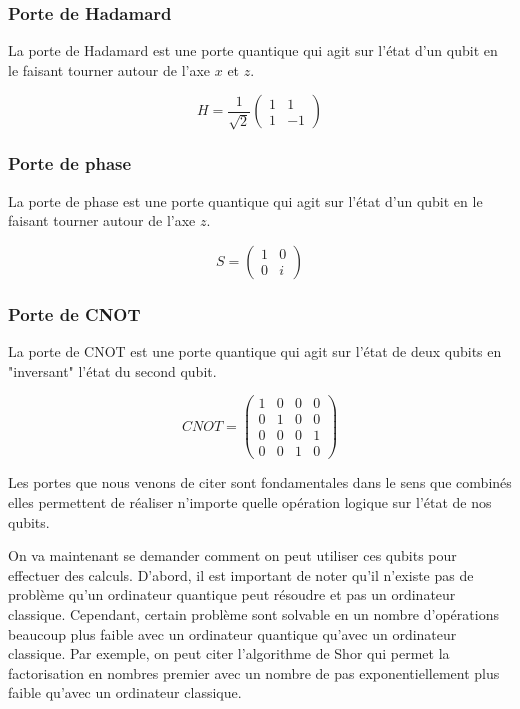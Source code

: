 \documentclass{article}
\begin{document}
\begin{multicols}{2}
\subsubsection{Porte de Hadamard}

La porte de Hadamard est une porte quantique qui agit sur l'état d'un qubit en le faisant tourner autour de l'axe $x$ et $z$.

\begin{equation}
    H = \frac{1}{\sqrt{2}}\begin{pmatrix} 1 & 1 \\ 1 & -1 \end{pmatrix}
\end{equation}

\subsubsection{Porte de phase}

La porte de phase est une porte quantique qui agit sur l'état d'un qubit en le faisant tourner autour de l'axe $z$.

\begin{equation}
    S = \begin{pmatrix} 1 & 0 \\ 0 & i \end{pmatrix}
\end{equation}


\subsubsection{Porte de CNOT}

La porte de CNOT est une porte quantique qui agit sur l'état de deux qubits en "inversant" l'état du second qubit.

\begin{equation}
    CNOT = \begin{pmatrix} 1 & 0 & 0 & 0 \\ 0 & 1 & 0 & 0 \\ 0 & 0 & 0 & 1 \\ 0 & 0 & 1 & 0 \end{pmatrix}
\end{equation}

Les portes que nous venons de citer sont fondamentales dans le sens que combinés elles permettent de réaliser n'importe quelle opération logique sur l'état de nos qubits.



On va maintenant se demander comment on peut utiliser ces qubits pour effectuer des calculs.
D'abord, il est important de noter qu'il n'existe pas de problème qu'un ordinateur quantique peut résoudre et pas un ordinateur classique.
Cependant, certain problème sont solvable en un nombre d'opérations beaucoup plus faible avec un ordinateur quantique qu'avec un ordinateur classique.
Par exemple, on peut citer l'algorithme de Shor qui permet la factorisation en nombres premier avec un nombre de pas exponentiellement plus faible qu'avec un ordinateur classique.




\end{multicols}
\end{document}
